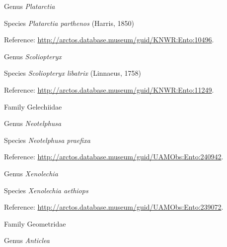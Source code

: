 \documentclass[9pt, article]{memoir}
\begin{document}
\begin{multicols}{2}
\vspace{6pt}\noindent\hspace{30pt}Genus \textit{Platarctia}


\vspace{6pt}\noindent\hspace{36pt}Species \textit{Platarctia parthenos} (Harris, 1850)


\vspace{6pt}Reference: 
\url{http://arctos.database.museum/guid/KNWR:Ento:10496}.

\vspace{6pt}\noindent\hspace{30pt}Genus \textit{Scoliopteryx}


\vspace{6pt}\noindent\hspace{36pt}Species \textit{Scoliopteryx libatrix} (Linnaeus, 1758)


\vspace{6pt}Reference: 
\url{http://arctos.database.museum/guid/KNWR:Ento:11249}.

\vspace{6pt}\noindent\hspace{24pt}Family Gelechiidae


\vspace{6pt}\noindent\hspace{30pt}Genus \textit{Neotelphusa}


\vspace{6pt}\noindent\hspace{36pt}Species \textit{Neotelphusa praefixa}


\vspace{6pt}Reference: 
\url{http://arctos.database.museum/guid/UAMObs:Ento:240942}.

\vspace{6pt}\noindent\hspace{30pt}Genus \textit{Xenolechia}


\vspace{6pt}\noindent\hspace{36pt}Species \textit{Xenolechia aethiops}


\vspace{6pt}Reference: 
\url{http://arctos.database.museum/guid/UAMObs:Ento:239072}.

\vspace{6pt}\noindent\hspace{24pt}Family Geometridae


\vspace{6pt}\noindent\hspace{30pt}Genus \textit{Anticlea}



\end{multicols}
\end{document}
